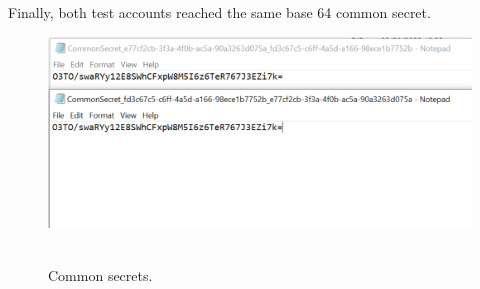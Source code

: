Finally, both test accounts reached the same base 64 common secret.
\begin{figure}[H]
    \centering
    \includegraphics[width=1\textwidth]{Pictures/Same_common_secret}
    ~\caption{Common secrets.}\label{fig:figure2}
\end{figure}